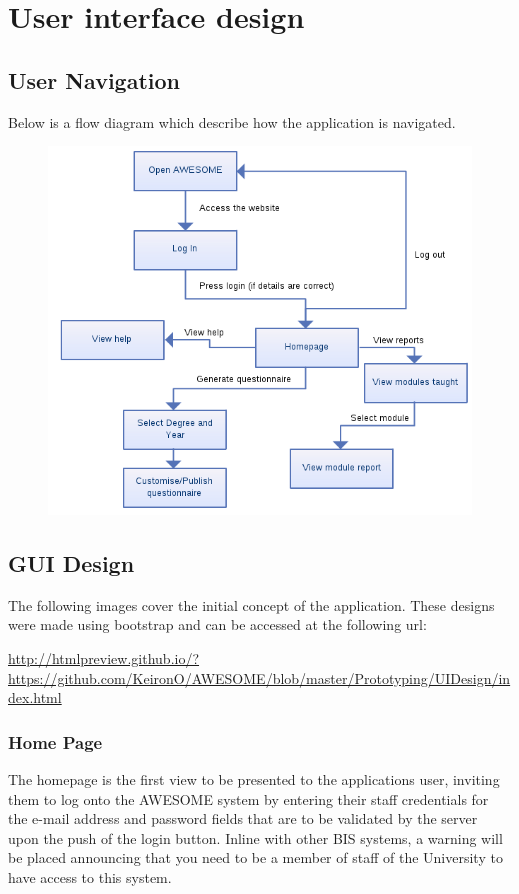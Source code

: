 \documentclass[11pt,a4paper]{article}
\begin{document}
\clearpage
\section{User interface design}

\subsection{User Navigation}

Below is a flow diagram which describe how the application is navigated.

\begin{figure}[h]
\centering
\includegraphics[width=0.85\linewidth]{images/flow/flow.png}
\end{figure}

\clearpage

\subsection{GUI Design}

The following images cover the initial concept of the application. These designs were made using bootstrap and can be accessed at the following url:

\url{http://htmlpreview.github.io/?https://github.com/KeironO/AWESOME/blob/master/Prototyping/UIDesign/index.html}

\subsubsection{Home Page}
The homepage is the first view to be presented to the applications user, inviting them to log onto the AWESOME system by entering their staff credentials for the e-mail address and password fields that are to be validated by the server upon the push of the login button. Inline with other BIS systems, a warning will be placed announcing that you need to be a member of staff of the University to have access to this system.
\end{document}

